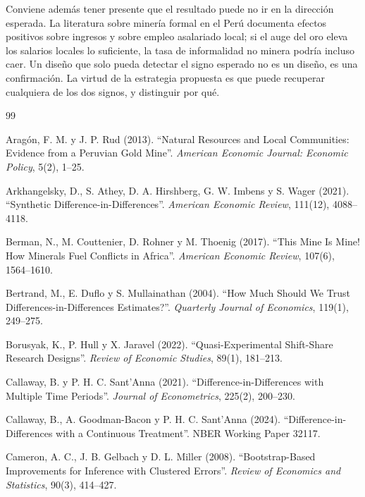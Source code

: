 \documentclass[11pt,a4paper]{article}
\begin{document}
Conviene además tener presente que el resultado puede no ir en la dirección esperada. La literatura sobre minería formal en el Perú documenta efectos positivos sobre ingresos y sobre empleo asalariado local; si el auge del oro eleva los salarios locales lo suficiente, la tasa de informalidad no minera podría incluso caer. Un diseño que solo pueda detectar el signo esperado no es un diseño, es una confirmación. La virtud de la estrategia propuesta es que puede recuperar cualquiera de los dos signos, y distinguir por qué.

\begin{thebibliography}{99}
\small

Aragón, F. M. y J. P. Rud (2013). ``Natural Resources and Local Communities: Evidence from a Peruvian Gold Mine''. \emph{American Economic Journal: Economic Policy}, 5(2), 1--25.

Arkhangelsky, D., S. Athey, D. A. Hirshberg, G. W. Imbens y S. Wager (2021). ``Synthetic Difference-in-Differences''. \emph{American Economic Review}, 111(12), 4088--4118.

Berman, N., M. Couttenier, D. Rohner y M. Thoenig (2017). ``This Mine Is Mine! How Minerals Fuel Conflicts in Africa''. \emph{American Economic Review}, 107(6), 1564--1610.

Bertrand, M., E. Duflo y S. Mullainathan (2004). ``How Much Should We Trust Differences-in-Differences Estimates?''. \emph{Quarterly Journal of Economics}, 119(1), 249--275.

Borusyak, K., P. Hull y X. Jaravel (2022). ``Quasi-Experimental Shift-Share Research Designs''. \emph{Review of Economic Studies}, 89(1), 181--213.

Callaway, B. y P. H. C. Sant'Anna (2021). ``Difference-in-Differences with Multiple Time Periods''. \emph{Journal of Econometrics}, 225(2), 200--230.

Callaway, B., A. Goodman-Bacon y P. H. C. Sant'Anna (2024). ``Difference-in-Differences with a Continuous Treatment''. NBER Working Paper 32117.

Cameron, A. C., J. B. Gelbach y D. L. Miller (2008). ``Bootstrap-Based Improvements for Inference with Clustered Errors''. \emph{Review of Economics and Statistics}, 90(3), 414--427.


\end{thebibliography}
\end{document}
